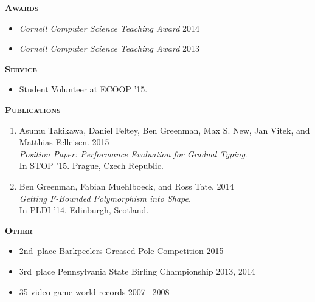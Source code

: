 \documentclass{article}
\newcommand{\mysection}[1]{\vspace{0.5cm}
\hspace{-1.3cm}\textsc{\textbf{#1}}~\hrulefill}
\begin{document}
\mysection{Awards} %
\begin{itemize}
\item \emph{Cornell Computer Science Teaching Award} \hfill 2014
\item \emph{Cornell Computer Science Teaching Award} \hfill 2013
\end{itemize}



\mysection{Service}
\begin{itemize}
\item Student Volunteer at ECOOP '15.
\end{itemize}


\mysection{Publications}

\begin{enumerate}
\item
  Asumu Takikawa, Daniel Feltey, Ben Greenman, Max S. New, Jan Vitek, and Matthias Felleisen. \hfill 2015 \\
  \emph{Position Paper: Performance Evaluation for Gradual Typing}. \\
  In STOP '15.
  Prague, Czech Republic.
\item
  Ben Greenman, Fabian Muehlboeck, and Ross Tate. \hfill 2014 \\
  \emph{Getting F-Bounded Polymorphism into Shape}. \\
  In PLDI '14.
  Edinburgh, Scotland.
\end{enumerate}


\mysection{Other}

\begin{itemize}
\item 2nd~place Barkpeelers Greased Pole Competition \hfill 2015
\item 3rd~place Pennsylvania State Birling Championship \hfill 2013, 2014
\item 35 video game world records \hfill 2007 \textendash\ 2008
\end{itemize}
\end{document}
